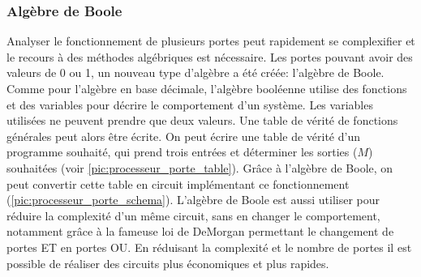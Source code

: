 \subsubsection{Algèbre de Boole}
Analyser le fonctionnement de plusieurs portes peut rapidement se complexifier et le recours à des méthodes algébriques est nécessaire. Les portes pouvant avoir des valeurs de 0 ou 1, un nouveau type d'algèbre a été créée: l'algèbre de Boole. Comme pour l'algèbre en base décimale, l'algèbre booléenne utilise des fonctions et des variables pour décrire le comportement d'un système. Les variables utilisées ne peuvent prendre que deux valeurs. Une table de vérité de fonctions générales peut alors être écrite. On peut écrire une table de vérité d'un programme souhaité, qui prend trois entrées et déterminer les sorties ($M$) souhaitées (voir \autoref{pic:processeur_porte_table}). Grâce à l'algèbre de Boole, on peut convertir cette table en circuit implémentant ce fonctionnement (\autoref{pic:processeur_porte_schema}).
L'algèbre de Boole est aussi utiliser pour réduire la complexité d'un même circuit, sans en changer le comportement, notamment grâce à la fameuse loi de DeMorgan \cite{hurley2014concise} permettant le changement de portes ET en portes OU. En réduisant la complexité et le nombre de portes il est possible de réaliser des circuits plus économiques et plus rapides.


